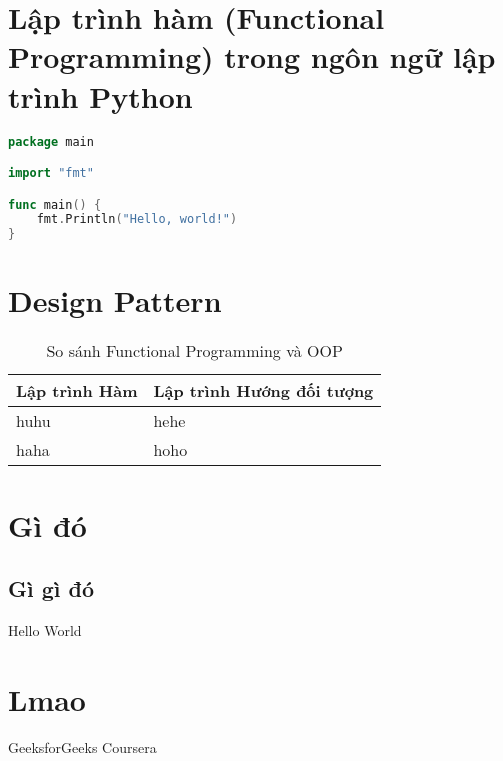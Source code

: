 
\newpage
\tableofcontents
\newpage


\section {Lập trình hàm (Functional Programming) trong ngôn ngữ lập trình Python}
\begin{lstlisting}[language=Go, caption=Example Go code]
package main

import "fmt"

func main() {
    fmt.Println("Hello, world!")
}
\end{lstlisting}

\section {Design Pattern}
\begin{table}[h]
    \centering
    \begin{tabular}{|p{7cm}|p{7cm}|}
        \hline
        \rowcolor{blue!10}\textbf{Lập trình Hàm} & \textbf{Lập trình Hướng đối tượng} \\
        \hline
        huhu & hehe \\
        \hline
        
        \hline
        haha & hoho  \\
        \hline
    \end{tabular}
    \caption{So sánh Functional Programming và OOP}
    \label{tab:example}
    
\end{table} 

\section{Gì đó}
\subsection{Gì gì đó}
{Hello World}

\section{Lmao}

\newpage
\begin{thebibliography}{80}
GeeksforGeeks
Coursera
\end{thebibliography}
\newpage
